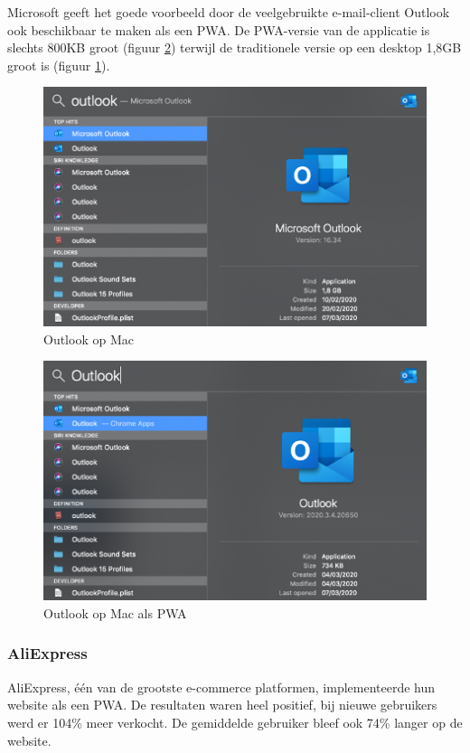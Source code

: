 		Microsoft geeft het goede voorbeeld door de veelgebruikte e-mail-client Outlook ook beschikbaar te maken als een PWA.
		De PWA-versie van de applicatie is slechts 800KB groot (figuur \ref{outlookPWA}) terwijl de traditionele versie op een desktop 1,8GB groot is (figuur \ref{outlookMac}).
		\begin{figure}[H]
			\centering
			\includegraphics{./img/Outlook_native.png}
			\caption{Outlook op Mac}
			\label{outlookMac}
		\end{figure}
		
		\begin{figure}[H]
			\centering
			\includegraphics{./img/Outlook_pwa.png}
			\caption{Outlook op Mac als PWA}
			\label{outlookPWA}
		\end{figure}
		
	\subsubsection{AliExpress}
		
		AliExpress, één van de grootste e-commerce platformen, implementeerde hun website als een PWA. De resultaten waren heel positief, bij nieuwe gebruikers werd er 104\% meer verkocht. De gemiddelde gebruiker bleef ook 74\% langer op de website.
		\autocite{Developers2020}
	
